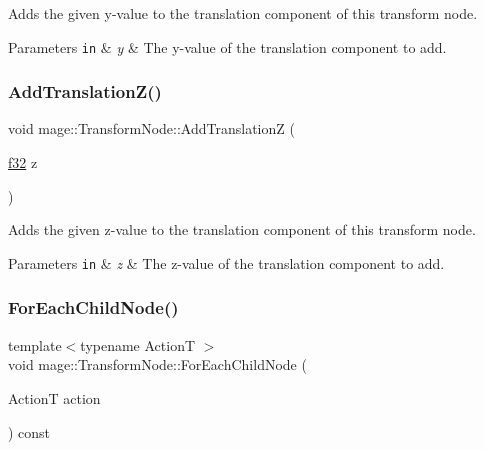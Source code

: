 Adds the given y-\/value to the translation component of this transform node.


\begin{DoxyParams}[1]{Parameters}
\mbox{\tt in}  & {\em y} & The y-\/value of the translation component to add. \\
\hline
\end{DoxyParams}
\hypertarget{structmage_1_1_transform_node_ad5d37bad6186ff7fd6f014a7d4597f80}{}\label{structmage_1_1_transform_node_ad5d37bad6186ff7fd6f014a7d4597f80} 
\subsubsection{\texorpdfstring{Add\+Translation\+Z()}{AddTranslationZ()}}
{\footnotesize\ttfamily void mage\+::\+Transform\+Node\+::\+Add\+TranslationZ (\begin{DoxyParamCaption}\item[{\hyperlink{namespacemage_a6a44ad388483959dc4dff9f2aef91431}{f32}}]{z }\end{DoxyParamCaption})\hspace{0.3cm}{\ttfamily [noexcept]}}

Adds the given z-\/value to the translation component of this transform node.


\begin{DoxyParams}[1]{Parameters}
\mbox{\tt in}  & {\em z} & The z-\/value of the translation component to add. \\
\hline
\end{DoxyParams}
\hypertarget{structmage_1_1_transform_node_a3dd36b373d27e3526df562ba899f721f}{}\label{structmage_1_1_transform_node_a3dd36b373d27e3526df562ba899f721f} 
\subsubsection{\texorpdfstring{For\+Each\+Child\+Node()}{ForEachChildNode()}}
{\footnotesize\ttfamily template$<$typename ActionT $>$ \\
void mage\+::\+Transform\+Node\+::\+For\+Each\+Child\+Node (\begin{DoxyParamCaption}\item[{ActionT}]{action }\end{DoxyParamCaption}) const\hspace{0.3cm}{\ttfamily [private]}}

